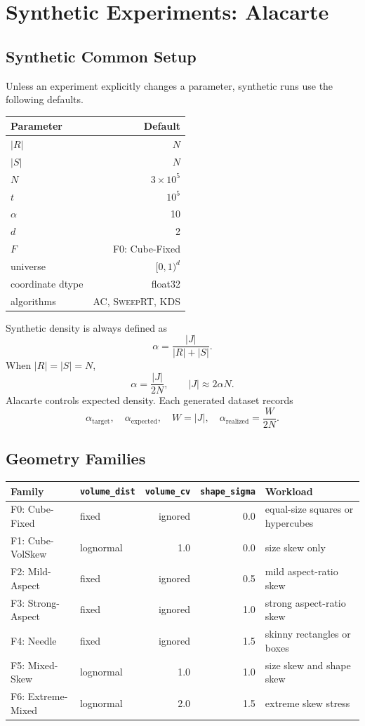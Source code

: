 \documentclass[11pt]{article}
\newcommand{\AC}{\textsc{AC}}
\newcommand{\SweepRT}{\textsc{SweepRT}}
\newcommand{\KDS}{\textsc{KDS}}
\begin{document}
\section{Synthetic Experiments: Alacarte}

\subsection{Synthetic Common Setup}
Unless an experiment explicitly changes a parameter, synthetic runs use the following defaults.

\begin{center}
\begin{tabularx}{0.72\linewidth}{@{}lr@{}}
\toprule
Parameter & Default \\
\midrule
$|R|$ & $N$ \\
$|S|$ & $N$ \\
$N$ & $3\times10^5$ \\
$t$ & $10^5$ \\
$\alpha$ & 10 \\
$d$ & 2 \\
$F$ & F0: Cube-Fixed \\
universe & $[0,1)^d$ \\
coordinate dtype & float32 \\
algorithms & \AC, \SweepRT, \KDS \\
\bottomrule
\end{tabularx}
\end{center}

Synthetic density is always defined as
\[
\alpha=\frac{|J|}{|R|+|S|}.
\]
When $|R|=|S|=N$,
\[
\alpha=\frac{|J|}{2N},
\qquad |J|\approx 2\alpha N.
\]
Alacarte controls expected density.  Each generated dataset records
\[
\alpha_{\mathrm{target}},\quad
\alpha_{\mathrm{expected}},\quad
W=|J|,\quad
\alpha_{\mathrm{realized}}=\frac{W}{2N}.
\]

\subsection{Geometry Families}
\begin{center}
\small
\begin{tabularx}{\linewidth}{@{}l l r r Y@{}}
\toprule
Family & \texttt{volume\_dist} & \texttt{volume\_cv} & \texttt{shape\_sigma} & Workload \\
\midrule
F0: Cube-Fixed & fixed & ignored & 0.0 & equal-size squares or hypercubes \\
F1: Cube-VolSkew & lognormal & 1.0 & 0.0 & size skew only \\
F2: Mild-Aspect & fixed & ignored & 0.5 & mild aspect-ratio skew \\
F3: Strong-Aspect & fixed & ignored & 1.0 & strong aspect-ratio skew \\
F4: Needle & fixed & ignored & 1.5 & skinny rectangles or boxes \\
F5: Mixed-Skew & lognormal & 1.0 & 1.0 & size skew and shape skew \\
F6: Extreme-Mixed & lognormal & 2.0 & 1.5 & extreme skew stress \\
\bottomrule
\end{tabularx}
\end{center}
\end{document}
